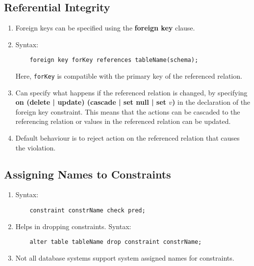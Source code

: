 \documentclass[journal,12pt,twocolumn]{IEEEtran}
\begin{document}
\subsection{Referential Integrity}
\begin{enumerate}
    \item Foreign keys can be specified using the \textbf{foreign key} clause.
    \item Syntax:
    \begin{lstlisting}
    foreign key forKey references tableName(schema);    
    \end{lstlisting}
    Here, \texttt{forKey} is compatible with the primary key of the referenced 
    relation.
    \item Can specify what happens if the referenced relation is changed, by
    specifying \textbf{on (delete | update) (cascade | set null | set $v$)} in 
    the declaration of the foreign key constraint. This means that the actions 
    can be cascaded to the referencing relation or values in the referenced 
    relation can be updated.
    \item Default behaviour is to reject action on the referenced relation that
    causes the violation.
\end{enumerate}

\subsection{Assigning Names to Constraints}
\begin{enumerate}
    \item Syntax: 
    \begin{lstlisting}
    constraint constrName check pred;
    \end{lstlisting}
    \item Helps in dropping constraints. Syntax: 
    \begin{lstlisting}
    alter table tableName drop constraint constrName;
    \end{lstlisting}
    \item Not all database systems support system assigned names for constraints.
\end{enumerate}
\end{document}
